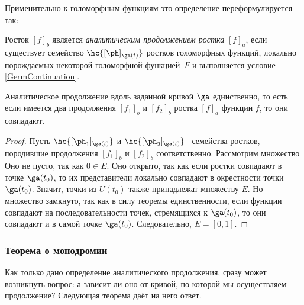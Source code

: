 \documentclass[a4paper]{article}
\begin{document}
Применительно к голоморфным функциям это определение переформулируется так:

\begin{df}
Росток $[f]_b$ является \emph{аналитическим продолжением ростка} $[f]_a$, если существует семейство
$\hc{[\ph]_{\ga(t)}}$ ростков голоморфных функций, локально порождаемых некоторой голоморфной функцией~$F$
и выполняется условие \eqref{GermContinuation}.
\end{df}

\begin{stm}
Аналитическое продолжение вдоль заданной кривой $\ga$ единственно, то есть если имеется два продолжения $[f_1]_b$ и $[f_2]_b$
ростка $[f]_a$ функции $f$, то они совпадают.
\end{stm}
\begin{proof}
Пусть $\hc{[\ph_1]_{\ga(t)}}$ и $\hc{[\ph_2]_{\ga(t)}}$-- семейства ростков, породившие продолжения $[f_1]_b$ и $[f_2]_b$
соответственно. Рассмотрим множество
Оно не пусто, так как $0\in E$. Оно открыто, так как если ростки совпадают в точке $\ga(t_0)$, то их представители локально совпадают в окрестности
точки $\ga(t_0)$. Значит, точки из $U(t_0)$ также принадлежат множеству $E$. Но множество замкнуто, так как в силу теоремы
единственности, если функции совпадают на последовательности точек, стремящихся к $\ga(t_0)$, то они совпадают и в самой точке
$\ga(t_0)$. Следовательно, $E=[0,1]$.
\end{proof}

\subsubsection{Теорема о монодромии}

Как только дано определение аналитического продолжения, сразу может возникнуть вопрос: а зависит ли оно от кривой,
по которой мы осуществляем продолжение? Следующая теорема даёт на него ответ.
\end{document}
